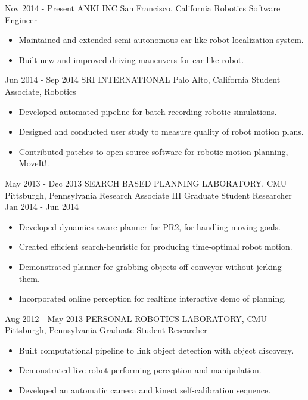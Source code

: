 \documentclass[]{friggeri-cv} %
\begin{document}
\begin{entrylist}
\jobentry
{Nov 2014 - Present}
{ANKI INC}
{San Francisco, California}
{Robotics Software Engineer}
{\begin{itemize}
\item Maintained and extended semi-autonomous car-like robot localization system.
\item Built new and improved driving maneuvers for car-like robot.
\end{itemize}}
\jobentry
{Jun 2014 - Sep 2014}
{SRI INTERNATIONAL}
{Palo Alto, California}
{Student Associate, Robotics}
{\begin{itemize}
\item Developed automated pipeline for batch recording robotic simulations.
\item Designed and conducted user study to measure quality of robot motion plans.
\item Contributed patches to open source software for robotic motion planning, MoveIt!.
\end{itemize}}
\jjobentry
{May 2013 - Dec 2013}
{SEARCH BASED PLANNING LABORATORY, CMU}
{Pittsburgh, Pennsylvania}
{Research Associate III}
{Graduate Student Researcher}
{Jan 2014 - Jun 2014}
{\begin{itemize}\item Developed dynamics-aware planner for PR2, for handling moving goals.
\item Created efficient search-heuristic for producing time-optimal robot motion.
\item Demonstrated planner for grabbing objects off conveyor without jerking them.
\item Incorporated online perception for realtime interactive demo of planning.
\end{itemize}}
\jobentry
{Aug 2012 - May 2013}
{PERSONAL ROBOTICS LABORATORY, CMU}
{Pittsburgh, Pennsylvania}
{Graduate Student Researcher}
{\begin{itemize}\item Built computational pipeline to link object detection with object discovery.
\item Demonstrated live robot performing perception and manipulation.
\item Developed an automatic camera and kinect self-calibration sequence.

\end{itemize}}
\end{entrylist}
\end{document}
